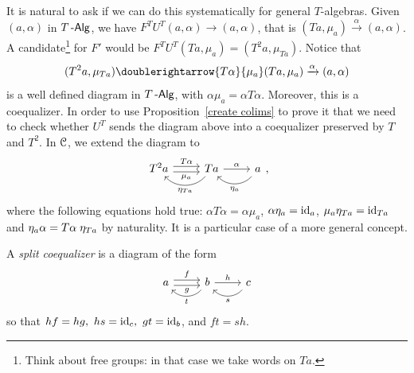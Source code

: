\documentclass[a4paper,11pt,oneside,openany]{scrbook}
\begin{document}
It is natural to ask if we can do this systematically for general $T$-algebras. Given $(a,\alpha)$ in $T\operatorname{-\mathsf{Alg}}$, we have $F^TU^T(a,\alpha)\to(a,\alpha)$, that is $(Ta,\mu_a)\xrightarrow{\alpha}(a,\alpha)$. A candidate\footnote{Think about free groups: in that case we take words on $Ta$.} for $F'$ would be $F^TU^T(Ta, \mu_a)=(T^2a, \mu_{Ta})$. Notice that 
\[
(T^2a,\mu_{Ta}) \doublerightarrow{T\alpha}{\mu_a}(Ta,\mu_a)\xrightarrow{\alpha}(a,\alpha)
\]
is a well defined diagram in $T\operatorname{-\mathsf{Alg}}$, with $\alpha\mu_a=\alpha T\alpha$. Moreover, this is a coequalizer. In order to use Proposition~\ref{create colims} to prove it that we need to check whether $U^T$ sends the diagram above into a coequalizer preserved by $T$ and $T^2$. In $\operatorname{\mathcal{C}}$, we extend the diagram to
\[
\begin{tikzcd}
T^2a\arrow[r, shift left, "T\alpha"] \arrow[r, shift right, "\mu_a"']
&Ta  \arrow[r, "\alpha"] \arrow[l, bend left=49, swap, "\eta_{Ta}"'] & a \arrow[l, bend left=49, swap, "\eta_a"']
\end{tikzcd}
,\]
where the following equations hold true: $\alpha T\alpha=\alpha\mu_a$, $\alpha\eta_a=\operatorname{id}_a$, $\mu_a\eta_{Ta}=\operatorname{id}_{Ta}$ and $\eta_a\alpha=T\alpha\hspace{1mm}\eta_{Ta}$ by naturality. It is a particular case of a more general concept.
\begin{defn}
	A \emph{split coequalizer} is a diagram of the form
	\vspace*{-2.4mm}
	\[
	\begin{tikzcd}[ampersand replacement=\&]
	a\arrow[r, shift left, "f"] \arrow[r, shift right, "g"']
\& b \arrow[r, "h"] \arrow[l, bend left=49, "t"] \& c \arrow[l, bend left=49, "s"]
	\end{tikzcd}
	\]
	so that $hf=hg,\ hs=\id_c,\ gt=\id_b$, and $ft=sh$.
\end{defn}
\end{document}
